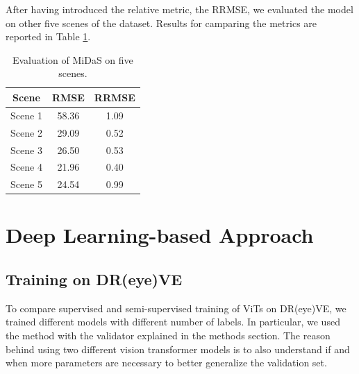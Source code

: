 After having introduced the relative metric, the RRMSE, we evaluated the model 
on other five scenes of the dataset. Results for camparing the metrics are reported in 
Table \ref{tab:mde_metrics}.
\begin{table}[h]
    \vspace{0.3cm}
    \centering
    \begin{tabular}{ccc}
    \hline
    \textbf{Scene} & \textbf{RMSE} & \textbf{RRMSE} \\ \hline\hline
    Scene 1 & 58.36 & 1.09 \\ \hline
    Scene 2 & 29.09 & 0.52 \\ \hline
    Scene 3 & 26.50 & 0.53 \\ \hline
    Scene 4 & 21.96 & 0.40 \\ \hline
    Scene 5 & 24.54 & 0.99 \\ \hline
    \end{tabular}
    \caption[MiDaS depth estimation evaluation on NuScenes dataset.]
    {Evaluation of MiDaS on five scenes.}
    \label{tab:mde_metrics}
\end{table}



\section {Deep Learning-based Approach}
\label{sec:exp_dl_approach}
\subsection{Training on DR(eye)VE}
To compare supervised and semi-supervised training of ViTs on DR(eye)VE, we 
trained different models with different number of labels. In particular, we 
used the method with the validator explained in the methods section.
The reason behind using two different vision transformer models is to also 
understand if and when more parameters are necessary to better generalize the 
validation set.

